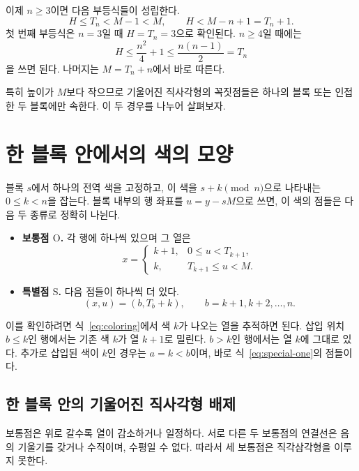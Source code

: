 \documentclass[a4paper,11pt]{article}
\theoremstyle{definition}
\newcommand{\OO}{\mathrm{O}}
\newcommand{\SSp}{\mathrm{S}}
\begin{document}
이제 $n\ge3$이면 다음 부등식들이 성립한다.
\begin{equation}\label{eq:height-comparisons}
  H\le T_n<M-1<M,
  \qquad H<M-n+1=T_n+1.
\end{equation}
첫 번째 부등식은 $n=3$일 때 $H=T_n=3$으로 확인된다.
$n\ge4$일 때에는
\[
  H\le\frac{n^2}{4}+1\le\frac{n(n-1)}2=T_n
\]
을 쓰면 된다. 나머지는 $M=T_n+n$에서 바로 따른다.

특히 높이가 $M$보다 작으므로 기울어진 직사각형의 꼭짓점들은
하나의 블록 또는 인접한 두 블록에만 속한다.
이 두 경우를 나누어 살펴보자.

\section{한 블록 안에서의 색의 모양}

블록 $s$에서 하나의 전역 색을 고정하고, 이 색을 $s+k\pmod n$으로
나타내는 $0\le k<n$을 잡는다. 블록 내부의 행 좌표를 $u=y-sM$으로
쓰면, 이 색의 점들은 다음 두 종류로 정확히 나뉜다.

\begin{itemize}
\item \textbf{보통점 $\OO$.} 각 행에 하나씩 있으며 그 열은
\begin{equation}\label{eq:ordinary-one}
  x=\begin{cases}
    k+1,&0\le u<T_{k+1},\\
    k,&T_{k+1}\le u<M.
  \end{cases}
\end{equation}
\item \textbf{특별점 $\SSp$.} 다음 점들이 하나씩 더 있다.
\begin{equation}\label{eq:special-one}
  (x,u)=(b,T_b+k),\qquad b=k+1,k+2,\ldots,n.
\end{equation}
\end{itemize}

이를 확인하려면 식~\eqref{eq:coloring}에서 색 $k$가 나오는 열을
추적하면 된다. 삽입 위치 $b\le k$인 행에서는 기존 색 $k$가
열 $k+1$로 밀린다. $b>k$인 행에서는 열 $k$에 그대로 있다.
추가로 삽입된 색이 $k$인 경우는 $a=k<b$이며, 바로
식~\eqref{eq:special-one}의 점들이다.

\subsection*{한 블록 안의 기울어진 직사각형 배제}

보통점은 위로 갈수록 열이 감소하거나 일정하다. 서로 다른 두 보통점의
연결선은 음의 기울기를 갖거나 수직이며, 수평일 수 없다.
따라서 세 보통점은 직각삼각형을 이루지 못한다.
\end{document}
